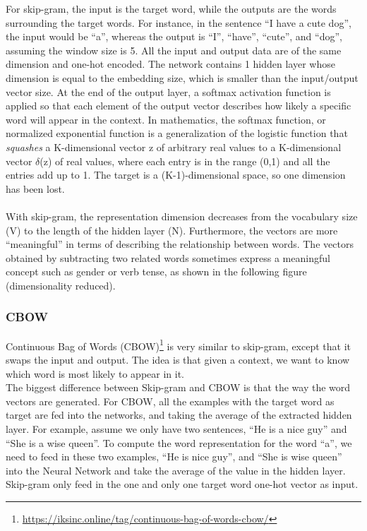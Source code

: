 For skip-gram, the input is the target word, while the outputs are the words surrounding the target words. For instance, in the sentence “I have a cute dog”, the input would be “a”, whereas the output is “I”, “have”, “cute”, and “dog”, assuming the window size is 5. All the input and output data are of the same dimension and one-hot encoded. The network contains 1 hidden layer whose dimension is equal to the embedding size, which is smaller than the input/output vector size. At the end of the output layer, a
softmax activation function is applied so that each element of the output vector describes how likely a specific word will appear in the context.
In mathematics, the softmax function, or normalized exponential function is a generalization of the logistic function that \textit{squashes} a K-dimensional vector z of arbitrary real values to a K-dimensional vector $\delta$(z) of real values, where each entry is in the range (0,1) and all the entries add up to 1. The target is a (K-1)-dimensional space, so one dimension has been lost.\\\\
With skip-gram, the representation dimension decreases from the vocabulary size (V) to the length of the hidden layer (N). Furthermore, the vectors are more “meaningful” in terms of describing the relationship between words. The vectors obtained by subtracting two related words sometimes express a meaningful concept such as gender or verb tense, as shown in the following figure (dimensionality reduced).

\subsubsection{CBOW}

Continuous Bag of Words (CBOW)\footnote{\url{https://iksinc.online/tag/continuous-bag-of-words-cbow/}} is very similar to skip-gram, except that it swaps the input and output. The idea is that given a context, we want to know which word is most likely to appear in it.\\
The biggest difference between Skip-gram and CBOW is that the way the word vectors are generated. For CBOW, all the examples with the target word as target are fed into the networks, and taking the average of the extracted hidden layer. For example, assume we only have two sentences, “He is a nice guy” and “She is a wise queen”. To compute the word representation for the word “a”, we need to feed in these two examples, “He is nice guy”, and “She is wise queen” into the Neural Network and take the average of the value in the hidden layer. Skip-gram only feed in the one and only one target word one-hot vector as input.

